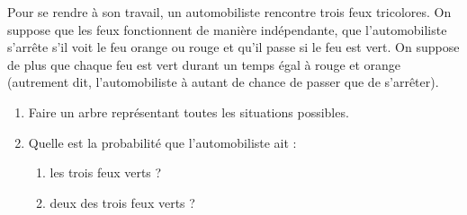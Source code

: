 \begin{exo}
Pour se rendre \`a son travail, un automobiliste rencontre trois feux tricolores. On suppose que les feux
fonctionnent de mani\`ere ind\'ependante, que l'automobiliste s'arrête s'il voit le feu orange ou rouge et qu'il passe
si le feu est vert. On suppose de plus que chaque feu est vert durant un temps \'egal \`a rouge et orange (autrement
dit, l'automobiliste \`a autant de chance de passer que de s'arrêter).
\begin{enumerate}
	\item Faire un arbre repr\'esentant toutes les situations possibles.
	\item Quelle est la probabilit\'e que l'automobiliste ait :
\vspace{-1em}\begin{multicols}{2}
\begin{enumerate}
	\item les trois feux verts ?
	\item deux des trois feux verts ?
\end{enumerate}
\end{multicols}\vspace{-1em}
\end{enumerate}
\end{exo}

